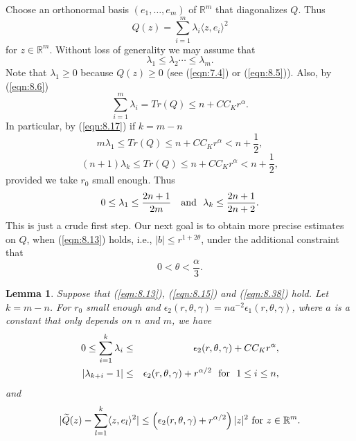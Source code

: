 \documentclass[12pt,leqno]{article}
\newcommand{\RR}{\mathbb{R}}
\theoremstyle{plain}
\newtheorem{lem}[thm]{Lemma}
\numberwithin{equation}{section}
\begin{document}
Choose an orthonormal basis $(e_1, \ldots, e_m)$ of $\RR^{m}$ that
diagonalizes $Q$. Thus
\begin{equation}\label{eqn:8.16}
Q(z)=\sum^m_{i=1}\lambda_i\langle z,e_i\rangle^2
\end{equation}
for $z\in\RR^{m}$. Without loss of generality we may assume that
\begin{equation}\label{eqn:8.17}
\lambda_1\le\lambda_2\cdots\le \lambda_m.
\end{equation}
Note that $\lambda_1\ge 0$ because $Q(z)\ge 0$ (see (\ref{eqn:7.4}) or
(\ref{eqn:8.5})). Also, by (\ref{eqn:8.6})
\begin{equation}\label{eqn:8.18}
\sum^m_{i=1}\lambda_i=Tr(Q)\le n+CC_Kr^\alpha.
\end{equation}
In particular, by (\ref{eqn:8.17}) if $k=m-n$
\begin{equation}\label{eqn:8.19}
m\lambda_1\le Tr(Q)\le n+CC_Kr^\alpha<n+\frac{1}{2},
\end{equation}
\begin{equation}\label{eqn:8.19A}
(n+1)\lambda_k\le Tr(Q)\le n+CC_Kr^\alpha<n+\frac{1}{2},
\end{equation}
provided we take $r_0$ small enough. Thus
\begin{equation}\label{eqn:8.20}
0\le\lambda_1\le \frac{2n+1}{2m}\ \ \hbox{ and}\ \
\lambda_k\le\frac{2n+1}{2n+2}.
\end{equation}
This is just a crude first step. Our next goal is to obtain more precise
estimates on $Q$, when (\ref{eqn:8.13}) holds, i.e., $|b|\le r^{1+2\theta}$,
under the additional constraint that
\begin{equation}\label{eqn:8.38}
0<\theta<\frac{\alpha}{3}.
\end{equation}

\begin{lem}\label{lem:8.39}
Suppose that (\ref{eqn:8.13}), (\ref{eqn:8.15}) and (\ref{eqn:8.38}) hold.
Let $k=m-n$.
For $r_0$ small enough and $\epsilon_2(r,\theta,\gamma)=n
a^{-2}\epsilon_1(r,\theta,\gamma)$, where $a$ is a constant
that only depends on $n$ and $m$, we have
\begin{eqnarray}
0  \le  \sum_{i=1}^k\lambda_i &\le& \epsilon_2(r,\theta,\gamma) +
CC_Kr^{\alpha}, \label{eqn:8.40} \\
|\lambda_{k+i}-1| & \le & \epsilon_2(r,\theta,\gamma) +r^{\alpha/2}
\ \hbox{ for }\ 1\le i\le n,
\label{eqn:8.41}
\end{eqnarray}
and
\begin{equation}\label{eqn:8.42}
|\widetilde Q(z)-\sum_{l=1}^k\langle z,e_l\rangle^2|
\le \left(\epsilon_2(r,\theta,\gamma) + r^{\alpha/2}\right)
|z|^2\hbox{ for
}z\in\RR^{m}.
\end{equation}
\end{lem}
\end{document}
